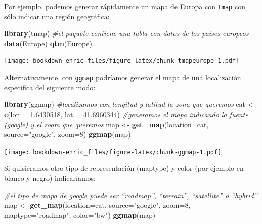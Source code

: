 \documentclass[]{book}
\newenvironment{Shaded}{\begin{snugshade}}{\end{snugshade}}
\newcommand{\KeywordTok}[1]{\textcolor[rgb]{0.13,0.29,0.53}{\textbf{{#1}}}}
\newcommand{\DataTypeTok}[1]{\textcolor[rgb]{0.13,0.29,0.53}{{#1}}}
\newcommand{\DecValTok}[1]{\textcolor[rgb]{0.00,0.00,0.81}{{#1}}}
\newcommand{\FloatTok}[1]{\textcolor[rgb]{0.00,0.00,0.81}{{#1}}}
\newcommand{\StringTok}[1]{\textcolor[rgb]{0.31,0.60,0.02}{{#1}}}
\newcommand{\CommentTok}[1]{\textcolor[rgb]{0.56,0.35,0.01}{\textit{{#1}}}}
\newcommand{\NormalTok}[1]{{#1}}
\theoremstyle{definition}
\theoremstyle{definition}
\theoremstyle{remark}
\begin{document}
Por ejemplo, podemos generar rápidamente un mapa de Europa con
\texttt{tmap} con sólo indicar una región geográfica:

\begin{Shaded}
\begin{Highlighting}[]
\KeywordTok{library}\NormalTok{(tmap)}
\CommentTok{#el paquete contiene una tabla con datos de los países europeos }
\KeywordTok{data}\NormalTok{(Europe)}
\KeywordTok{qtm}\NormalTok{(Europe)}
\end{Highlighting}
\end{Shaded}

\texttt{[image: bookdown-enric\_files/figure-latex/chunk-tmapeurope-1.pdf]}

Alternativamente, con \texttt{ggmap} podríamos generar el mapa de una
localización específica del siguiente modo:

\begin{Shaded}
\begin{Highlighting}[]
\KeywordTok{library}\NormalTok{(ggmap)}
\CommentTok{#localizamos con longitud y latitud la zona que queremos}
\NormalTok{cat <-}\StringTok{ }\KeywordTok{c}\NormalTok{(}\DataTypeTok{lon =} \FloatTok{1.6430518}\NormalTok{, }\DataTypeTok{lat =} \FloatTok{41.6960344}\NormalTok{)}
\CommentTok{#generamos el mapa indicando la fuente (google) y el zoom que queremos}
\NormalTok{map <-}\StringTok{ }\KeywordTok{get_map}\NormalTok{(}\DataTypeTok{location=}\NormalTok{cat, }\DataTypeTok{source=}\StringTok{"google"}\NormalTok{, }\DataTypeTok{zoom=}\DecValTok{8}\NormalTok{)}
\KeywordTok{ggmap}\NormalTok{(map)}
\end{Highlighting}
\end{Shaded}

\texttt{[image: bookdown-enric\_files/figure-latex/chunk-ggmap-1.pdf]}

Si quisieramos otro tipo de representación (maptype) y color (por
ejemplo en blanco y negro) indicaríamos:

\begin{Shaded}
\begin{Highlighting}[]
\CommentTok{#el tipo de mapa de google puede ser “roadmap”, “terrain”, “satellite” o “hybrid”}
\NormalTok{map <-}\StringTok{ }\KeywordTok{get_map}\NormalTok{(}\DataTypeTok{location=}\NormalTok{cat, }\DataTypeTok{source=}\StringTok{"google"}\NormalTok{, }\DataTypeTok{zoom=}\DecValTok{8}\NormalTok{, }\DataTypeTok{maptype=}\StringTok{"roadmap"}\NormalTok{, }\DataTypeTok{color=}\StringTok{"bw"}\NormalTok{)}
\KeywordTok{ggmap}\NormalTok{(map)}
\end{Highlighting}
\end{Shaded}
\end{document}
